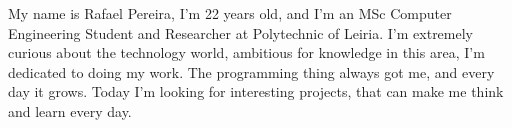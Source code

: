 \documentclass[a4paper,fleqn]{cas-dc}
\begin{document}
%
%




My name is Rafael Pereira, I'm 22 years old, and I'm an MSc Computer Engineering Student and Researcher at Polytechnic of Leiria. I'm extremely curious about the technology world, ambitious for knowledge in this area, I'm dedicated to doing my work. The programming thing always got me, and every day it grows. Today I'm looking for interesting projects, that can make me think and learn every day.
\endbio
\end{document}
